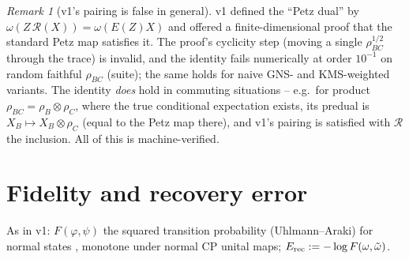 \documentclass[11pt]{article}
\theoremstyle{remark}
\newtheorem{remark}[theorem]{Remark}
\newcommand{\Erec}{E_{\rm rec}}
\begin{document}
\begin{remark}[v1's pairing is false in general]
\label{rem:pairingfalse}
v1 defined the ``Petz dual'' by $\omega(Z\,\mathcal{R}(X)) =
\omega(E(Z)X)$ and offered a finite-dimensional proof that the standard
Petz map satisfies it. The proof's cyclicity step (moving a single
$\rho_{BC}^{1/2}$ through the trace) is invalid, and the identity fails
numerically at order $10^{-1}$ on random faithful $\rho_{BC}$ (suite);
the same holds for naive GNS- and KMS-weighted variants. The identity
\emph{does} hold in commuting situations -- e.g.\ for product
$\rho_{BC} = \rho_B \otimes \rho_C$, where the true conditional
expectation exists, its predual is $X_B \mapsto X_B \otimes \rho_C$
(equal to the Petz map there), and v1's pairing is satisfied with
$\mathcal{R}$ the inclusion. All of this is machine-verified.
\end{remark}

\section{Fidelity and recovery error}
As in v1: $F(\varphi,\psi)$ the squared transition probability
(Uhlmann--Araki) for normal states \cite{Araki, AR}, monotone under
normal CP unital maps; $\Erec := -\log F(\omega, \tilde\omega)$.
\end{document}
